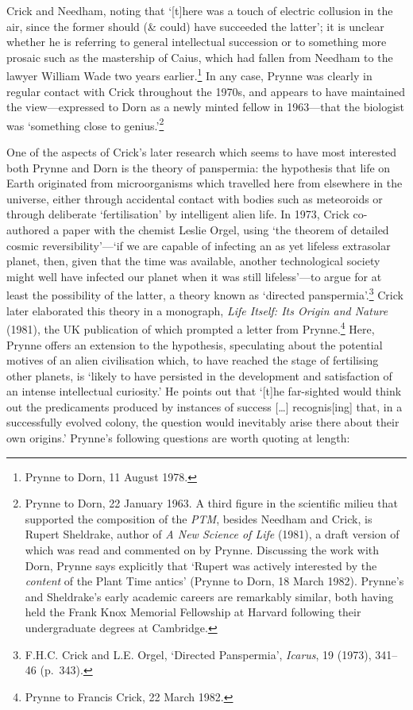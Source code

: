 \documentclass[]{article}
\begin{document}
Crick and Needham, noting that `{[}t{]}here was a touch of electric
collusion in the air, since the former should (\& could) have succeeded
the latter'; it is unclear whether he is referring to general
intellectual succession or to something more prosaic such as the
mastership of Caius, which had fallen from Needham to the lawyer William
Wade two years earlier.\footnote{Prynne to Dorn, 11 August 1978.} In any
case, Prynne was clearly in regular contact with Crick throughout the
1970s, and appears to have maintained the view---expressed to Dorn as a
newly minted fellow in 1963---that the biologist was `something close to
genius.'\footnote{Prynne to Dorn, 22 January 1963. A third figure in the
  scientific milieu that supported the composition of the \emph{PTM},
  besides Needham and Crick, is Rupert Sheldrake, author of \emph{A New
  Science of Life} (1981), a draft version of which was read and
  commented on by Prynne. Discussing the work with Dorn, Prynne says
  explicitly that `Rupert was actively interested by the \emph{content}
  of the Plant Time antics' (Prynne to Dorn, 18 March 1982). Prynne's
  and Sheldrake's early academic careers are remarkably similar, both
  having held the Frank Knox Memorial Fellowship at Harvard following
  their undergraduate degrees at Cambridge.}

One of the aspects of Crick's later research which seems to have most
interested both Prynne and Dorn is the theory of panspermia: the
hypothesis that life on Earth originated from microorganisms which
travelled here from elsewhere in the universe, either through accidental
contact with bodies such as meteoroids or through deliberate
`fertilisation' by intelligent alien life. In 1973, Crick co-authored a
paper with the chemist Leslie Orgel, using `the theorem of detailed
cosmic reversibility'---`if we are capable of infecting an as yet
lifeless extrasolar planet, then, given that the time was available,
another technological society might well have infected our planet when
it was still lifeless'---to argue for at least the possibility of the
latter, a theory known as `directed panspermia'.\footnote{F.H.C. Crick
  and L.E. Orgel, `Directed Panspermia', \emph{Icarus}, 19 (1973),
  341--46 (p.~343).} Crick later elaborated this theory in a monograph,
\emph{Life Itself: Its Origin and Nature} (1981), the UK publication of
which prompted a letter from Prynne.\footnote{Prynne to Francis Crick,
  22 March 1982.} Here, Prynne offers an extension to the hypothesis,
speculating about the potential motives of an alien civilisation which,
to have reached the stage of fertilising other planets, is `likely to
have persisted in the development and satisfaction of an intense
intellectual curiosity.' He points out that `{[}t{]}he far-sighted would
think out the predicaments produced by instances of success
{[}\ldots{}{]} recognis{[}ing{]} that, in a successfully evolved colony,
the question would inevitably arise there about their own origins.'
Prynne's following questions are worth quoting at length:
\end{document}
